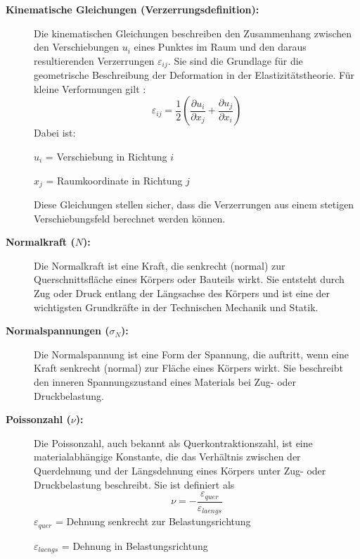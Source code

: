 \begin{description}
	\item[\textbf{Kinematische Gleichungen (Verzerrungsdefinition):}] Die kinematischen Gleichungen beschreiben den Zusammenhang zwischen den Verschiebungen $u_i$ eines Punktes im Raum und den daraus resultierenden Verzerrungen $\varepsilon_{ij}$. 
	Sie sind die Grundlage für die geometrische Beschreibung der Deformation in der Elastizitätstheorie. 
	Für kleine Verformungen gilt \cite{elastomechanik:Technische_Mechanik_2:Elastostatik}:
	\begin{equation}
		\varepsilon_{ij} = 
		\frac{1}{2} \left( \frac{\partial u_i}{\partial x_j} + \frac{\partial u_j}{\partial x_i} \right)
	\end{equation}
	Dabei ist:
	
		$u_i$ = Verschiebung in Richtung $i$
		
		$x_j$ = Raumkoordinate in Richtung $j$
		
	Diese Gleichungen stellen sicher, dass die Verzerrungen aus einem stetigen Verschiebungsfeld berechnet werden können.
	
	\item[\textbf{Normalkraft ($N$):}] Die Normalkraft ist eine Kraft, die senkrecht (normal) zur Querschnittsfläche eines Körpers oder Bauteils wirkt. 
	Sie entsteht durch Zug oder Druck entlang der Längsachse des Körpers und ist eine der wichtigsten Grundkräfte in der Technischen Mechanik und Statik.
	
	\item[\textbf{Normalspannungen ($\sigma_N$):}] Die Normalspannung ist eine Form der Spannung, die auftritt, wenn eine Kraft senkrecht (normal) zur Fläche eines Körpers wirkt. 
	Sie beschreibt den inneren Spannungszustand eines Materials bei Zug- oder Druckbelastung.
	
	\item[\textbf{Poissonzahl ($\nu$):}] Die Poissonzahl, auch bekannt als Querkontraktionszahl, ist eine materialabhängige Konstante, die das Verhältnis zwischen der Querdehnung und der Längsdehnung eines Körpers unter Zug- oder Druckbelastung beschreibt.
	Sie ist definiert als
	\begin{equation}
		\nu=
		-\frac{\varepsilon_{quer}}{\varepsilon_{laengs}}
	\end{equation}
	$\varepsilon_{quer}$ = Dehnung senkrecht zur Belastungsrichtung
	
	$\varepsilon_{laengs}$ = Dehnung in Belastungsrichtung
	

\end{description}
